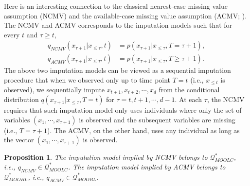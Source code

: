 \documentclass[aos, preprint]{imsart}
\theoremstyle{plain}
\newtheorem{proposition}[theorem]{Proposition}
\theoremstyle{definition}
\begin{document}
Here is an interesting connection to the classical nearest-case missing value assumption (NCMV)
and the available-case missing value assumption (ACMV; \citealt{molenberghs1998monotone}).
The NCMV and ACMV corresponds to the imputation models such that 
for every $t$ and $\tau\geq t$, 
\begin{equation}
\begin{aligned}
q_{NCMV}(x_{\tau+1}|x_{\leq \tau}, t)  &=p(x_{\tau+1}|x_{\leq \tau}, T= \tau+1),\\
q_{ACMV}(x_{\tau+1}|x_{\leq \tau}, t)  &=p(x_{\tau+1}|x_{\leq \tau}, T\geq \tau+1).
\end{aligned}
\label{eq::acmv}
\end{equation}
The above two imputation models can be viewed as a sequential imputation procedure that
when we observed only up to time point $T=t$ (i.e., $x_{\leq t}$ is observed), we sequentially impute $x_{t+1},x_{t+2},\cdots, x_d$
from the conditional distribution $q(x_{\tau+1}|x_{\leq \tau}, T=t)$ for $\tau=t,t+1,\cdots, d-1$.
At each $\tau$,
the NCMV requires that such imputation model only uses individuals where only the set of variables $(x_1,\cdots, x_{\tau+1})$ is observed and
the subsequent variables are missing (i.e., $T=\tau+1$). 
The ACMV, on the other hand, uses any individual as long as the vector $(x_1,\cdots, x_{\tau+1})$
is observed. 


\begin{proposition}
The imputation model implied by NCMV belongs to $\mathcal{Q}^*_{MOOLC}$, i.e., $q_{NCMV} \in \mathcal{Q}^*_{MOOLC}$.
The imputation model implied by ACMV belongs to $\mathcal{Q}^*_{MOOBL}$, i.e., $q_{ACMV}\in \mathcal{Q}^*_{MOOBL}$.
\label{prop::acmv}
\end{proposition}
\end{document}
